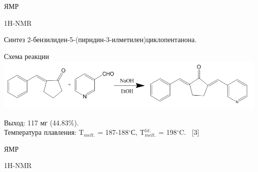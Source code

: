 \documentclass{beamer}
\begin{document}
\begin{frame}{ЯМР}
\begin{block}{1H-NMR}
\begin{center}
\end{center}
\end{block}
\end{frame}

\begin{frame}{Синтез 2-бензилиден-5-(пиридин-3-илметилен)циклопентанона.}
\begin{block}{Схема реакции}
\includegraphics[scale=0.31]{../pictures/3.png}
\end{block}
\begin{block}{}
Выход: 117 мг (44.83$\%$). \\
Температура плавления: T$_{melt.}$ = 187-188$^{\circ}$С, T$_{melt.}^{lit.}$ = 198$^{\circ}$C. \ [3] \\
\end{block}
\end{frame}

\begin{frame}{ЯМР}
\begin{block}{1H-NMR}
\begin{center}
\end{center}
\end{block}
\end{frame}
\end{document}
